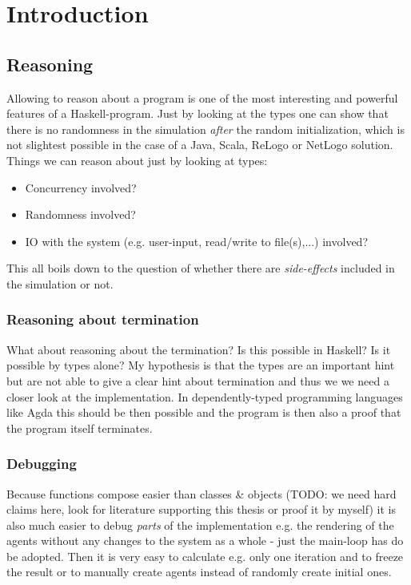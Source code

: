 \chapter{Introduction}

\section{Reasoning}
Allowing to reason about a program is one of the most interesting and powerful features of a Haskell-program. Just by looking at the types one can show that there is no randomness in the simulation \textit{after} the random initialization, which is not slightest possible in the case of a Java, Scala, ReLogo or NetLogo solution. Things we can reason about just by looking at types:

\begin{itemize}
\item Concurrency involved?
\item Randomness involved?
\item IO with the system (e.g. user-input, read/write to file(s),...) involved?
\end{itemize}

This all boils down to the question of whether there are \textit{side-effects} included in the simulation or not.

\subsection{Reasoning about termination}
What about reasoning about the termination? Is this possible in Haskell? Is it possible by types alone? My hypothesis is that the types are an important hint but are not able to give a clear hint about termination and thus we we need a closer look at the implementation. In dependently-typed programming languages like Agda this should be then possible and the program is then also a 
proof that the program itself terminates.

\subsection{Debugging}
Because functions compose easier than classes \& objects (TODO: we need hard claims here, look for literature supporting this thesis or proof it by myself) it is also much easier to debug \textit{parts} of the implementation e.g. the rendering of the agents without any changes to the system as a whole - just the main-loop has do be adopted. Then it is very easy to calculate e.g. only one iteration and to freeze the result or to manually create agents instead of randomly create initial ones.

